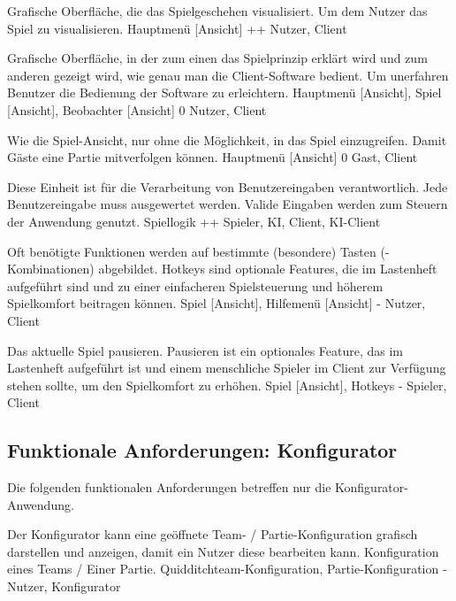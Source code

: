         {Grafische Oberfläche, die das Spielgeschehen visualisiert.}
        {Um dem Nutzer das Spiel zu visualisieren.}
        {Hauptmenü [Ansicht]}
        {++}
        {Nutzer, Client}	
        
        {Grafische Oberfläche, in der zum einen das Spielprinzip erklärt wird und zum anderen gezeigt wird, wie genau man die Client-Software bedient.}
        {Um unerfahren Benutzer die Bedienung der Software zu erleichtern.}
        {Hauptmenü [Ansicht], Spiel [Ansicht], Beobachter [Ansicht]}
        {0}
        {Nutzer, Client}
        
        {Wie die Spiel-Ansicht, nur ohne die Möglichkeit, in das Spiel einzugreifen.}
        {Damit Gäste eine Partie mitverfolgen können.}
        {Hauptmenü [Ansicht]}
        {0}
        {Gast, Client}

        {Diese Einheit ist für die Verarbeitung von Benutzereingaben verantwortlich.}
        {Jede Benutzereingabe muss ausgewertet werden. Valide Eingaben werden zum Steuern der Anwendung genutzt.}
        {Spiellogik}
        {++}
        {Spieler, KI, Client, KI-Client}
        
        {Oft benötigte Funktionen werden auf bestimmte (besondere) Tasten (-Kombinationen) abgebildet.}
        {Hotkeys sind optionale Features, die im Lastenheft aufgeführt sind und zu einer einfacheren Spielsteuerung und höherem Spielkomfort beitragen können.}
        {Spiel [Ansicht], Hilfemenü [Ansicht]}
        {-}
        {Nutzer, Client}
        
        {Das aktuelle Spiel pausieren.}
        {Pausieren ist ein optionales Feature, das im Lastenheft aufgeführt ist und einem menschliche Spieler im Client zur Verfügung stehen sollte, um den Spielkomfort zu erhöhen.}
        {Spiel [Ansicht], Hotkeys}
        {-}
        {Spieler, Client}
        

\subsection{Funktionale Anforderungen: Konfigurator}
    
Die folgenden funktionalen Anforderungen betreffen nur die Konfigurator-Anwendung.

        {Der Konfigurator kann eine geöffnete Team- / Partie-Konfiguration grafisch darstellen und anzeigen, damit ein Nutzer diese bearbeiten kann.}
        {Konfiguration eines Teams / Einer Partie.}
        {Quidditchteam-Konfiguration, Partie-Konfiguration}
        {-}
        {Nutzer, Konfigurator}	

